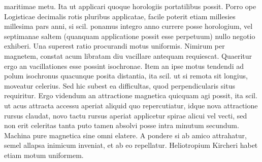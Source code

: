 maritimae metu. Ita ut applicari quoque horologiis portatilibus\protect{} possit. Porro ope Logisticae decimalis rotis pluribus applicatae, facile poterit etiam millesies millesima pars anni, si scil. ponamus integro anno currere posse horologium\protect{}, vel septimanae  saltem (quanquam applicatione possit esse perpetuum)  nullo negotio exhiberi. Una superest ratio procurandi motus uniformis\protect{}. Nimirum per magnetem\protect{}, constat acum  libratam diu vacillare antequam requiescat. Quaeritur ergo an vacillationes esse possint isochronae. Item an ipse motus tendendi ad polum isochronus quacunque posita distantia, ita scil.  ut si remota sit longius, moveatur celerius. Sed hic subest  ea difficultas, quod perpendicularis situs requiritur. Ergo  videndum an attractione magnetica\protect{} quicquam agi possit, ita  scil. ut acus attracta accessu aperiat aliquid quo repercutiatur, idque nova attractione\protect{} rursus claudat, novo tactu rursus aperiat  applicetur spirae\protect{} alicui vel vecti, sed non erit celeritas\protect{} tanta  puto tamen absolvi posse intra minutum secundum. Machina pure magnetica sine omni elatere. A pondere si ab amico attrahatur, semel allapsa inimicum inveniat, et  ab eo repellatur. Heliotropium Kircheri\protect{} habet etiam motum uniformem\protect{}.\pend
 


 


 

 

 


 


 


 


 

